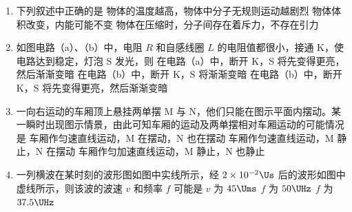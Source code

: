 \documentclass[\gkver]{gaokaozhenti}
\begin{document}
\begin{enumerate}
\item
下列叙述中正确的是
{物体的温度越高，物体中分子无规则运动越剧烈}
{物体体积改变，内能可能不变}
{物体在压缩时，分子间存在着斥力，不存在引力}

\item
如图电路（a）、（b）中，电阻 $R$ 和自感线圈 $L$ 的电阻值都很小，接通 K，使电路达到稳定，灯泡 S 发光，则
\onepicture[w=7.00cm]{}
{在电路（a）中，断开 K，S 将先变得更亮，然后渐渐变暗}
{在电路（b）中，断开 K，S 将渐渐变暗}
{在电路（b）中，断开 K，S 将先变得更亮，然后渐渐变暗}

\item
一向右运动的车厢顶上悬挂两单摆 M 与 N，他们只能在图示平面内摆动。某一瞬时出现图示情景，由此可知车厢的运动及两单摆相对车厢运动的可能情况是
\onepicture[w=4.61cm]{}
{车厢作匀速直线运动，M 在摆动，N 也在摆动}
{车厢作匀速直线运动，M 静止，N 在摆动}
{车厢作匀加速直线运动，M 静止，N 也静止}

\item
一列横波在某时刻的波形图如图中实线所示，经 $2 \times 10^{-2}\Us$ 后的波形如图中虚线所示，则该波的波速 $v$ 和频率 $f$ 可能是
\onepicture[w=8.41cm]{}
{$v$ 为 $45\Ums$}
{$f$ 为 $50\UHz$}
{$f$ 为 $37.5\UHz$}


\end{enumerate}
\end{document}
